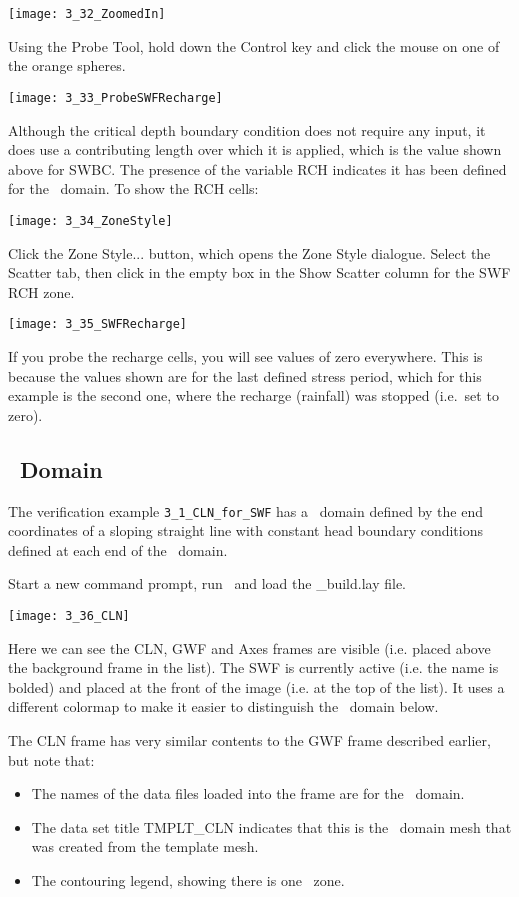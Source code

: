         \texttt{[image: 3\_32\_ZoomedIn]}

Using the {\sf Probe Tool}, hold down the {\sf Control} key and click the mouse on one of the orange spheres.

        \texttt{[image: 3\_33\_ProbeSWFRecharge]}

Although the critical depth boundary condition does not require any input, it does use a contributing length over which it is applied, which is the value shown above for {\sf SWBC}.  The presence of the variable {\sf RCH} indicates it has been defined for the \swf\ domain.  To show the {\sf RCH} cells:

        \texttt{[image: 3\_34\_ZoneStyle]}

Click the {\sf Zone Style...} button, which opens the {\sf Zone Style} dialogue.  Select the {\sf Scatter} tab, then click in the empty box in the {\sf Show Scatter} column for the {\sf SWF RCH} zone.

        \texttt{[image: 3\_35\_SWFRecharge]}

If you probe the recharge cells, you will see values of zero everywhere.  This is because the values shown are for the last defined stress period, which for this example is the second one, where the recharge (rainfall) was stopped (i.e.\ set to zero).

\subsection{\cln\ Domain}
The verification example \texttt{3\_1\_CLN\_for\_SWF} has a \cln\ domain defined by the end coordinates of a sloping straight line  with constant head boundary conditions defined at each end of the \gwf\ domain.

Start a new command prompt, run \tecplot\ and load the {\sf \_build.lay} file.

        \texttt{[image: 3\_36\_CLN]}

Here we can see the {\sf CLN,  GWF} and {\sf Axes} frames are visible (i.e. placed above the {\sf background} frame in the list).  The {\sf SWF} is currently active (i.e. the name is bolded) and placed at the front of the image (i.e. at the top of the list). It uses a different colormap to make it easier to distinguish the \gwf\ domain below.

The {\sf CLN} frame has very similar contents to the {\sf GWF} frame described earlier, but note that:
\begin{itemize}
  \item The names of the data files loaded into the frame are for the \swf\ domain.
  \item   The data set title {\sf TMPLT\_CLN} indicates that this is the \swf\ domain mesh that was created from the template mesh.
  \item The contouring legend, showing there is one \cln\ zone. \end{itemize}

